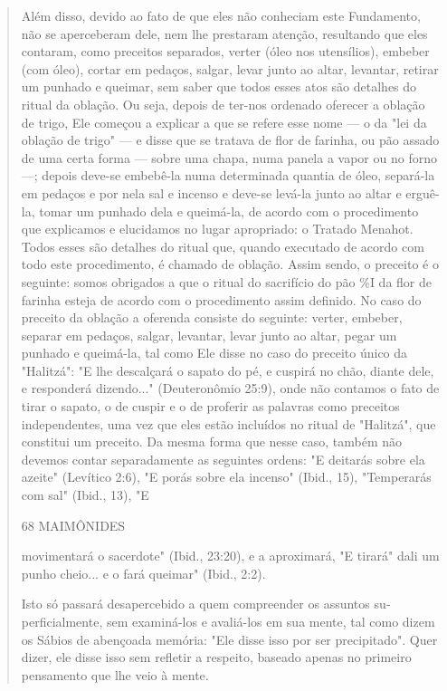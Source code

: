\begin{quote}
Além disso, devido ao fato de que eles não conheciam este Funda­mento,
não se aperceberam dele, nem lhe prestaram atenção, resultando que eles
contaram, como preceitos separados, verter (óleo nos utensílios),
embe­ber (com óleo), cortar em pedaços, salgar, levar junto ao altar,
levantar, retirar um punhado e queimar, sem saber que todos esses atos
são detalhes do ritual da oblação. Ou seja, depois de ter-nos ordenado
oferecer a oblação de trigo, Ele começou a explicar a que se refere esse
nome --- o da "lei da oblação de trigo" --- e disse que se tratava de
flor de farinha, ou pão assado de uma certa forma --- sobre uma chapa,
numa panela a vapor ou no forno ---; depois de­ve-se embebê-la numa
determinada quantia de óleo, separá-la em pedaços e por nela sal e
incenso e deve-se levá-la junto ao altar e erguê-la, tomar um punhado
dela e queimá-la, de acordo com o procedimento que explicamos e
elucidamos no lugar apropriado: o Tratado Menahot. Todos esses são
detalhes do ritual que, quando executado de acordo com todo este
procedimento, é chamado de obla­ção. Assim sendo, o preceito é o
seguinte: somos obrigados a que o ritual do sacrifício do pão \%I da
flor de farinha esteja de acordo com o procedimento assim definido. No
caso do preceito da oblação a oferenda consiste do seguin­te: verter,
embeber, separar em pedaços, salgar, levantar, levar junto ao altar,
pegar um punhado e queimá-la, tal como Ele disse no caso do preceito
único da "Halitzá": "E lhe descalçará o sapato do pé, e cuspirá no chão,
diante dele, e responderá dizendo..." (Deuteronômio 25:9), onde não
contamos o fato de tirar o sapato, o de cuspir e o de proferir as
palavras como preceitos indepen­dentes, uma vez que eles estão incluídos
no ritual de "Halitzá", que constitui um preceito. Da mesma forma que
nesse caso, também não devemos contar separadamente as seguintes ordens:
"E deitarás sobre ela azeite" (Levítico 2:6), "E porás sobre ela
incenso" (Ibid., 15), "Temperarás com sal" (Ibid., 13), "E

68 MAIMÔNIDES

movimentará o sacerdote" (Ibid., 23:20), e a aproximará, "E tirará" dali
um pu­nho cheio... e o fará queimar" (Ibid., 2:2).

Isto só passará desapercebido a quem compreender os assuntos
su­perficialmente, sem examiná-los e avaliá-los em sua mente, tal como
dizem os Sábios de abençoada memória: "Ele disse isso por ser
precipitado". Quer di­zer, ele disse isso sem refletir a respeito,
baseado apenas no primeiro pensa­mento que lhe veio à mente.


\end{quote}
